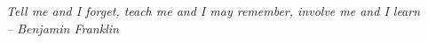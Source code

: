 \documentclass[a4paper, 11pt]{article} %
\begin{document}
%
%
%
%
%
%

\clearpage
\vspace*{\fill}
\begin{center}
    \textit{Tell me and I forget, teach me and I may remember, involve me and I learn\\ -- Benjamin Franklin}
\end{center}
\vspace*{\fill}

\clearpage


\end{document}
